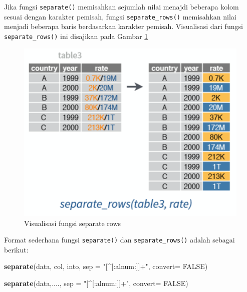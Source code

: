 \documentclass[]{book}
\newenvironment{Shaded}{\begin{snugshade}}{\end{snugshade}}
\newcommand{\KeywordTok}[1]{\textcolor[rgb]{0.13,0.29,0.53}{\textbf{#1}}}
\newcommand{\DataTypeTok}[1]{\textcolor[rgb]{0.13,0.29,0.53}{#1}}
\newcommand{\StringTok}[1]{\textcolor[rgb]{0.31,0.60,0.02}{#1}}
\newcommand{\OtherTok}[1]{\textcolor[rgb]{0.56,0.35,0.01}{#1}}
\newcommand{\NormalTok}[1]{#1}
\begin{document}
Jika fungsi \texttt{separate()} memisahkan sejumlah nilai menajdi
beberapa kolom sesuai dengan karakter pemisah, fungsi
\texttt{separate\_rows()} memisahkan nilai menjadi beberapa baris
berdasarkan karakter pemisah. Visualisasi dari fungsi
\texttt{separate\_rows()} ini disajikan pada Gambar
\ref{fig:separaterows}

\begin{figure}

{\centering \includegraphics[width=6.44in]{separate_rows} 

}

\caption{Visualisasi fungsi separate rows}\label{fig:separaterows}
\end{figure}

Format sederhana fungsi \texttt{separate()} dan
\texttt{separate\_rows()} adalah sebagai berikut:

\begin{Shaded}
\begin{Highlighting}[]
\KeywordTok{separate}\NormalTok{(data, col, into, }\DataTypeTok{sep =} \StringTok{"[^[:alnum:]]+"}\NormalTok{, }\DataTypeTok{convert=} \OtherTok{FALSE}\NormalTok{)}

\KeywordTok{separate}\NormalTok{(data,...., }\DataTypeTok{sep =} \StringTok{"[^[:alnum:]]+"}\NormalTok{, }\DataTypeTok{convert=} \OtherTok{FALSE}\NormalTok{)}
\end{Highlighting}
\end{Shaded}
\end{document}
